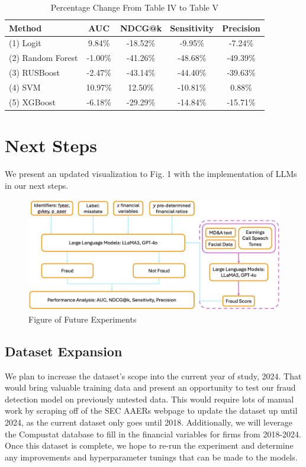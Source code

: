 \documentclass[conference]{IEEEtran}
\begin{document}
\begin{table}[H]
\caption{Percentage Change From Table IV to Table V}
\centering
\begin{tabular}{p{2.295cm}cccc}
\toprule
\textbf{Method} & \textbf{AUC} & \textbf{NDCG@k} & \textbf{Sensitivity} & \textbf{Precision} \\
\midrule
\raggedright (1) Logit & 9.84\% & -18.52\% & -9.95\% & -7.24\% \\
\raggedright (2) Random Forest & -1.00\% & -41.26\% & -48.68\% & -49.39\% \\
\raggedright (3) RUSBoost & -2.47\% & -43.14\% & -44.40\% & -39.63\% \\
\raggedright (4) SVM & 10.97\% & 12.50\% & -10.81\% & 0.88\% \\
\raggedright (5) XGBoost & -6.18\% & -29.29\% & -14.84\% & -15.71\% \\
\bottomrule
\end{tabular}
\label{tab:performance}
\end{table} \vspace{0.1pt}

\section{Next Steps} We present an updated visualization to Fig. 1 with the implementation of LLMs in our next steps. \vspace{15pt}\begin{figure}[H]
	\centerline{\includegraphics[width=\columnwidth]{llmmethod}}
	\caption{Figure of Future Experiments}
	\label{fig}
	\end{figure} \vspace{15pt}
\subsection{Dataset Expansion}
We plan to increase the dataset's scope into the current year of study, 2024. That would bring valuable training data and present an opportunity to test our fraud detection model on previously untested data. This would require lots of manual work by scraping off of the SEC AAERs webpage to update the dataset up until 2024, as the current dataset only goes until 2018. Additionally, we will leverage the Compustat database to fill in the financial variables for firms from 2018-2024. Once this dataset is complete, we hope to re-run the experiment and determine any improvements and hyperparameter tunings that can be made to the models. 
\end{document}
